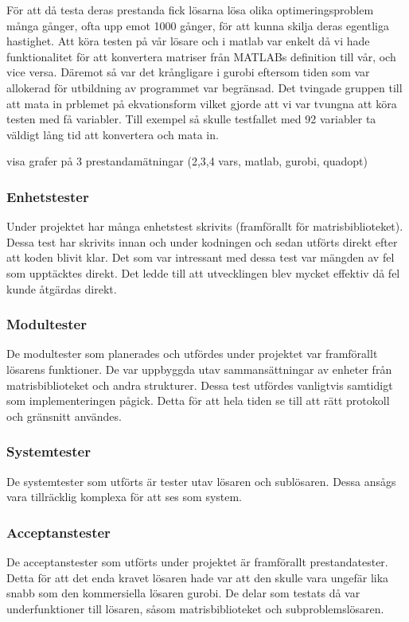 	För att då testa deras prestanda fick lösarna lösa olika optimeringsproblem många gånger, ofta upp emot 1000 gånger, för att kunna skilja deras egentliga hastighet. Att köra testen på vår lösare och i matlab var enkelt då vi hade funktionalitet för att konvertera matriser från MATLABs definition till vår, och vice versa. Däremot så var det krångligare i gurobi eftersom tiden som var allokerad för utbildning av programmet var begränsad. Det tvingade gruppen till att mata in prblemet på ekvationsform vilket gjorde att vi var tvungna att köra testen med få variabler. Till exempel så skulle testfallet med 92 variabler ta väldigt lång tid att konvertera och mata in. \newline

	visa grafer på 3 prestandamätningar (2,3,4 vars, matlab, gurobi, quadopt) 	
	
	\subsubsection{Enhetstester}
	Under projektet har många enhetstest skrivits (framförallt för matrisbiblioteket). Dessa test har skrivits innan och under kodningen och sedan utförts direkt efter att koden blivit klar. Det som var intressant med dessa test var mängden av fel som upptäcktes direkt. Det ledde till att utvecklingen blev mycket effektiv då fel kunde åtgärdas direkt.
	
	\subsubsection{Modultester}
	De modultester som planerades och utfördes under projektet var framförallt lösarens funktioner. De var uppbyggda utav sammansättningar av enheter från matrisbiblioteket och andra strukturer. Dessa test utfördes vanligtvis samtidigt som implementeringen pågick. Detta för att hela tiden se till att rätt protokoll och gränsnitt användes.
	
	\subsubsection{Systemtester}
	De systemtester som utförts är tester utav lösaren och sublösaren. Dessa ansågs vara tillräcklig komplexa för att ses som system. 
	
	
	\subsubsection{Acceptanstester}
	De acceptanstester som utförts under projektet är framförallt prestandatester. Detta för att det enda kravet lösaren hade var att den skulle vara ungefär lika snabb som den kommersiella lösaren gurobi. De delar som testats då var underfunktioner till lösaren, såsom matrisbiblioteket och subproblemslösaren.
	
